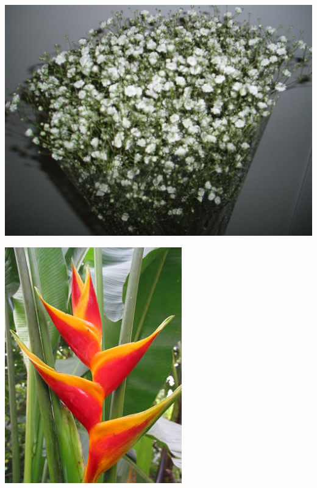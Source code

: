 \documentclass{article}
\begin{document}
\begin{center}
\includegraphics[width=0.9\textheight, angle=90]{../Gypsophilia.jpg}
\end{center}
\newpage

\begin{center}
\includegraphics[width=0.9\textheight, angle=90]{../Heliconia.jpg}
\end{center}
\newpage
\end{document}
